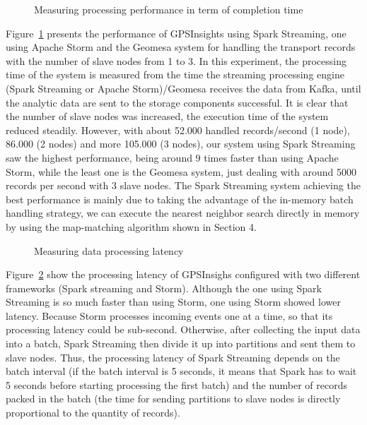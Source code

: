 \documentclass{acm_proc_article-sp}
\begin{document}
	
	\begin{figure}[h]
		\centering
		\caption{Measuring processing performance in term of completion time}
		\label{fig:performance}
	\end{figure}

Figure~\ref{fig:performance} presents the performance of GPSInsights using Spark Streaming, one using Apache Storm and the Geomesa system for handling the transport records with the number of slave nodes from 1 to 3. In this experiment, the processing time of the system is measured from the time the streaming processing engine (Spark Streaming or Apache Storm)/Geomesa receives the data from Kafka, until the analytic data are sent to the storage components successful. It is clear that the number of slave nodes was increased, the execution time of the system reduced steadily. However, with about 52.000 handled records/second (1 node), 86.000 (2 nodes) and more 105.000 (3 nodes), our system using Spark Streaming saw the highest performance, being around 9 times faster than using Apache Storm, while the least one is the Geomesa system, just dealing with around 5000 records per second with 3 slave nodes. The Spark Streaming system achieving the best performance is mainly due to taking the advantage of the in-memory batch handling strategy, we can execute the nearest neighbor search directly in memory by using the map-matching algorithm shown in Section 4.

	\begin{figure}[h]
		\centering
		\caption{Measuring data processing latency}
		\label{fig:timedelay}
	\end{figure}
	
Figure~\ref{fig:timedelay} show the processing latency of GPSInsighs configured with two different frameworks (Spark streaming and Storm). Although the one using Spark Streaming is so much faster than using Storm, one using Storm showed lower latency. Because Storm processes incoming events one at a time, so that its processing latency could be sub-second. Otherwise, after collecting the input data into a batch, Spark Streaming then divide it up into partitions and sent them to slave nodes. Thus, the processing latency of Spark Streaming depends on the batch interval (if the batch interval is 5 seconds, it means that Spark has to wait 5 seconds before starting processing the first batch)  and the number of records packed in the batch (the time for sending partitions to slave nodes is directly proportional to the quantity of records).
\end{document}

